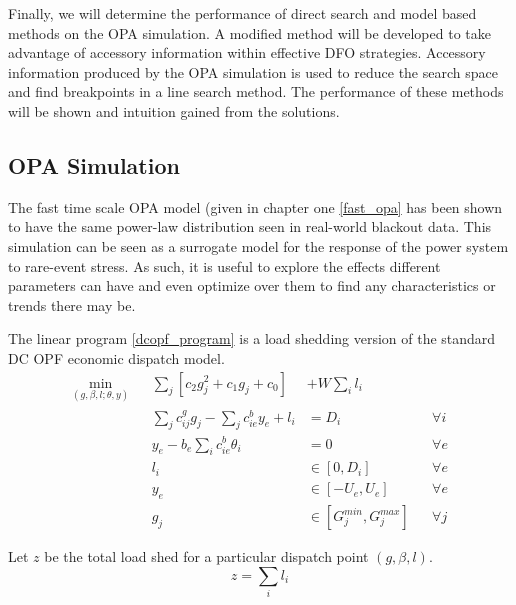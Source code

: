 Finally, we will determine the performance of direct search and model based methods on the OPA simulation.  A modified method will be developed to take advantage of accessory information within effective DFO strategies.  Accessory information produced by the OPA simulation is used to reduce the search space and find breakpoints in a line search method.  The performance of these methods will be shown and intuition gained from the solutions.

\subsection*{OPA Simulation}

The fast time scale OPA model (given in chapter one \ref{fast_opa} has been shown to have the same power-law distribution seen in real-world blackout data.  This simulation can be seen as a surrogate model for the response of the power system to rare-event stress.  As such, it is useful to explore the effects different parameters can have and even optimize over them to find any characteristics or trends there may be.

The linear program \ref{dcopf_program} is a load shedding version of the standard DC OPF economic dispatch model.  
\begin{subequations}
\label{dcopf_program}
\begin{alignat}{3}
\min_{\left(g,\beta,l;\theta,y\right)} && \displaystyle\sum_j \left[  c_2 g_j^2  + c_1 g_j + c_0 \right] &+ W \sum_i l_i &  \label{jcc_obj}\\
                        && \textstyle \sum_j c^g_{ij} g_j - \sum_j c^b_{ie} y_e   +l_i       &=D_i       && \forall i \label{opf_cons}\\ 
                 && y_e - b_e \textstyle \sum_i c^b_{ie} \theta_i          &=0         && \forall e \label{opf_kcl}\\
                 && l_i &\in \left[ 0, D_i \right] && \forall e \label{opf_loadshed}\\
                 && y_e &\in \left[ -U_e, U_e \right] && \forall e \label{opf_limit}\\
                 && g_j &\in \left[ G^{min}_j, G^{max}_j \right] && \forall j  \label{opf_gen}  
\end{alignat}
\end{subequations}


Let $z$ be the total load shed for a particular dispatch point $(g,\beta,l)$.
\begin{equation}
z = \sum_i l_i
\end{equation}

